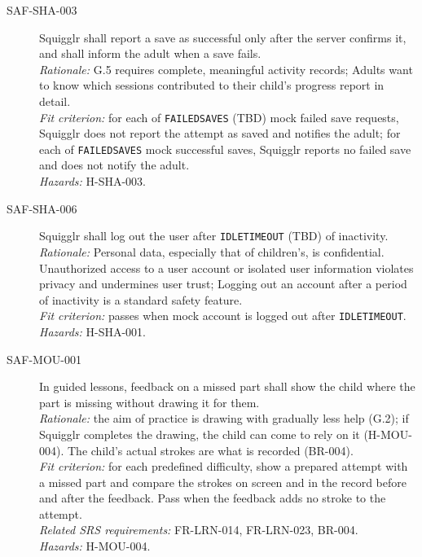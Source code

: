 \documentclass[12pt]{article}
\renewcommand{\_}{\textunderscore\allowbreak}%
\begin{document}
\begin{description}
\item[SAF-SHA-003]\label{req:SAF-SHA-003} Squigglr shall report a
save as successful only after the server confirms it, and shall inform the adult
when a save fails.\\
\emph{Rationale:} G.5 requires complete, meaningful activity records; Adults
want to know which sessions contributed to their child's progress report in
detail.\\
\emph{Fit criterion:} for each of \texttt{FAILED\_SAVES} (TBD) mock failed save
requests, Squigglr does not report the attempt as saved and notifies the adult;
for each of \texttt{FAILED\_SAVES} mock successful saves, Squigglr reports no
failed save and does not notify the adult.\\
\emph{Hazards:} H-SHA-003.

\item[SAF-SHA-006]\label{req:SAF-SHA-006} Squigglr shall log out
the user after \texttt{IDLE\_TIMEOUT} (TBD) of inactivity.\\
\emph{Rationale:} Personal data, especially that of children's, is confidential.
Unauthorized access to a user account or isolated user information violates
privacy and undermines user trust; Logging out an account after a period of
inactivity is a standard safety feature. \\
\emph{Fit criterion:} passes when mock account is logged out after
\texttt{IDLE\_TIMEOUT}. \\
\emph{Hazards:} H-SHA-001.

\item[SAF-MOU-001] In guided lessons, feedback on a missed part shall show the
child where the part is missing without drawing it for them.\\
\emph{Rationale:} the aim of practice is drawing with gradually less help (G.2);
if Squigglr completes the drawing, the child can come to rely on it (H-MOU-004).
The child's actual strokes are what is recorded (BR-004).\\
\emph{Fit criterion:} for each predefined difficulty, show a prepared attempt
with a missed part and compare the strokes on screen and in the record before
and after the feedback. Pass when the feedback adds no stroke to the attempt.\\
\emph{Related SRS requirements:} FR-LRN-014, FR-LRN-023, BR-004.\\
\emph{Hazards:} H-MOU-004.


\end{description}
\end{document}
